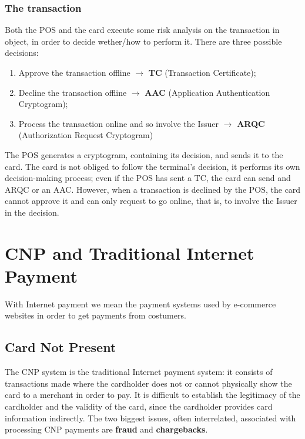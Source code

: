 \documentclass[a4paper, 10pt, titlepage]{article}
\begin{document}
\subsubsection{The transaction}
Both the POS and the card execute some risk analysis on the transaction in object, in order to decide wether/how to perform it. There are three possible decisions:
\begin{enumerate}
\item Approve the transaction offline $\rightarrow$ \textbf{TC} (Transaction Certificate);
\item Decline the transaction offline $\rightarrow$ \textbf{AAC} (Application Authentication Cryptogram);
\item Process the transaction online and so involve the Issuer $\rightarrow$ \textbf{ARQC} (Authorization Request Cryptogram)
\end{enumerate}
The POS generates a cryptogram, containing its decision, and sends it to the card. The card is not obliged to follow the terminal's decision, it performs its own decision-making process; even if the POS has sent a TC, the card can send and ARQC or an AAC. However, when a transaction is declined by the POS, the card cannot approve it and can only request to go online, that is, to involve the Issuer in the decision.

\section{CNP and Traditional Internet Payment}
With Internet payment we mean the payment systems used by e-commerce websites in order to get payments from costumers.
\subsection{Card Not Present}
The CNP system is the traditional Internet payment system: it consists of transactions made where the cardholder does not or cannot physically show the card to a merchant in order to pay. It is difficult to establish the legitimacy of the cardholder and the validity of the card, since the cardholder provides card information indirectly. The two biggest issues, often interrelated, associated with processing CNP payments are \textbf{fraud} and \textbf{chargebacks}.
\end{document}
